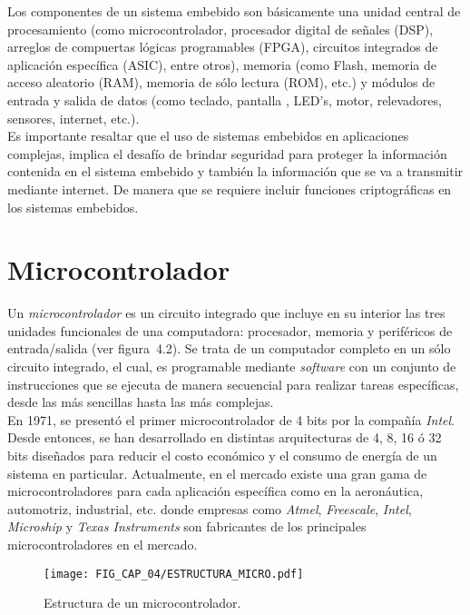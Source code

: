 Los componentes de un sistema embebido son básicamente una unidad central de procesamiento (como microcontrolador, procesador digital de señales (DSP), arreglos de compuertas lógicas programables (FPGA), circuitos integrados de aplicación específica (ASIC), entre otros), memoria (como Flash, memoria de acceso aleatorio (RAM), memoria de sólo lectura (ROM), etc.) y módulos de entrada y salida de datos (como teclado, pantalla , LED's, motor, relevadores, sensores, internet, etc.).  \\  

Es importante resaltar que el uso de sistemas embebidos en aplicaciones complejas, implica el desafío de brindar seguridad para proteger la información contenida en el sistema embebido y también la información que se va a transmitir mediante internet. De manera que se requiere incluir funciones criptográficas en los sistemas embebidos. 

\section{Microcontrolador}
Un \textit{microcontrolador} es un circuito integrado que incluye en su interior las tres unidades funcionales de una computadora: procesador, memoria y periféricos de entrada/salida (ver figura~4.2). Se trata de un computador completo en un sólo circuito integrado, el cual, es programable mediante \textit{software} con un conjunto de instrucciones que se ejecuta de manera secuencial para realizar tareas específicas, desde las más sencillas hasta las más complejas. \\

En 1971, se presentó el primer microcontrolador de 4 bits por la compañía \textit{Intel}. Desde entonces, se han desarrollado en distintas arquitecturas de 4, 8, 16 ó 32 bits diseñados para reducir el costo económico y el consumo de energía de un sistema en particular. Actualmente, en el mercado existe una gran gama de microcontroladores para cada aplicación específica como en la aeronáutica, automotriz, industrial, etc. donde empresas como \textit{Atmel}, \textit{Freescale}, \textit{Intel}, \textit{Microship} y \textit{Texas Instruments} son fabricantes de los principales microcontroladores en el mercado.  \\

\begin{figure}[!htbp] %
	\center
	\texttt{[image: FIG\_CAP\_04/ESTRUCTURA\_MICRO.pdf]}   
	\caption{Estructura de un microcontrolador.}
\end{figure}  

